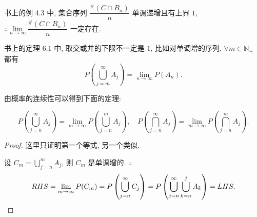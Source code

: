 \documentclass[color=black,device=normal,lang=cn]{elegantnote}
\numberwithin{equation}{section}
\theoremstyle{plain}
\numberwithin{exercise}{exsection}
\begin{document}
书上的例 4.3 中, 集合序列 $\dfrac{^\#(C\cap B_n)}{n}$ 单调递增且有上界 $1$, $\therefore\lim\limits_{n\to\infty}\dfrac{^\#(C\cap B_n)}{n}$ 一定存在.

书上的定理 6.1 中, 取交或并的下限不一定是 $1$, 比如对单调增的序列, $\forall m\in\mathbb{N}_+$ 都有
\[P\left(\bigcup\limits_{j=m}^\infty A_j\right)=\lim\limits_{n\to\infty}P(A_n).\]

由概率的连续性可以得到下面的定理:
\begin{theorem}\label{t1.3}
    \[P\left(\bigcup\limits_{j=n}^\infty A_j\right)=\lim\limits_{m\to\infty}P\left(\bigcup\limits_{j=n}^mA_j\right),\quad P\left(\bigcap\limits_{j=n}^\infty A_j\right)=\lim\limits_{m\to\infty}P\left(\bigcap\limits_{j=n}^mA_j\right).\]
\end{theorem}
\begin{proof}
    这里只证明第一个等式, 另一个类似.

    设 $C_m=\bigcup\limits_{j=n}^mA_j$, 则 $C_m$ 是单调增的. $\therefore$
    \[RHS=\lim\limits_{m\to\infty}P(C_m)=P\left(\bigcup\limits_{j=n}^\infty C_j\right)=P\left(\bigcup\limits_{j=n}^\infty\bigcup\limits_{k=n}^jA_k\right)=LHS.\qedhere\]
\end{proof}
\end{document}
